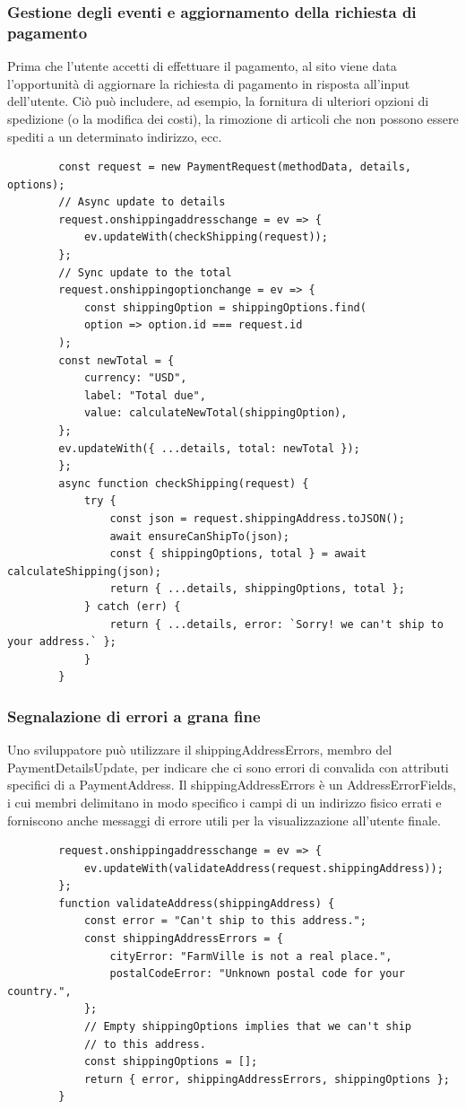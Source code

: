 \documentclass[italian]{article}
\begin{document}
	\subsubsection{Gestione degli eventi e aggiornamento della richiesta di pagamento}
	Prima che l'utente accetti di effettuare il pagamento, al sito viene data l'opportunità di aggiornare la richiesta di pagamento in risposta all'input dell'utente. Ciò può includere, ad esempio, la fornitura di ulteriori opzioni di spedizione (o la modifica dei costi), la rimozione di articoli che non possono essere spediti a un determinato indirizzo, ecc.
	
	\pagebreak
	\begin{lstlisting}
		const request = new PaymentRequest(methodData, details, options);
		// Async update to details
		request.onshippingaddresschange = ev => {
			ev.updateWith(checkShipping(request));
		};
		// Sync update to the total
		request.onshippingoptionchange = ev => {
			const shippingOption = shippingOptions.find(
			option => option.id === request.id
		);
		const newTotal = {
			currency: "USD",
			label: "Total due",
			value: calculateNewTotal(shippingOption),
		};
		ev.updateWith({ ...details, total: newTotal });
		};
		async function checkShipping(request) {
			try {
				const json = request.shippingAddress.toJSON();
				await ensureCanShipTo(json);
				const { shippingOptions, total } = await calculateShipping(json);
				return { ...details, shippingOptions, total };
			} catch (err) {
				return { ...details, error: `Sorry! we can't ship to your address.` };
			}
		}
	\end{lstlisting}
	
	\subsubsection{Segnalazione di errori a grana fine}
	Uno sviluppatore può utilizzare il shippingAddressErrors, membro del PaymentDetailsUpdate, per indicare che ci sono errori di convalida con attributi specifici di a PaymentAddress. Il shippingAddressErrors è un AddressErrorFields, i cui membri delimitano in modo specifico i campi di un indirizzo fisico errati e forniscono anche messaggi di errore utili per la visualizzazione all'utente finale.
	
	\begin{lstlisting}
		request.onshippingaddresschange = ev => {
			ev.updateWith(validateAddress(request.shippingAddress));
		};
		function validateAddress(shippingAddress) {
			const error = "Can't ship to this address.";
			const shippingAddressErrors = {
				cityError: "FarmVille is not a real place.",
				postalCodeError: "Unknown postal code for your country.",
			};
			// Empty shippingOptions implies that we can't ship
			// to this address.
			const shippingOptions = [];
			return { error, shippingAddressErrors, shippingOptions };
		}
	\end{lstlisting}
	
\end{document}
